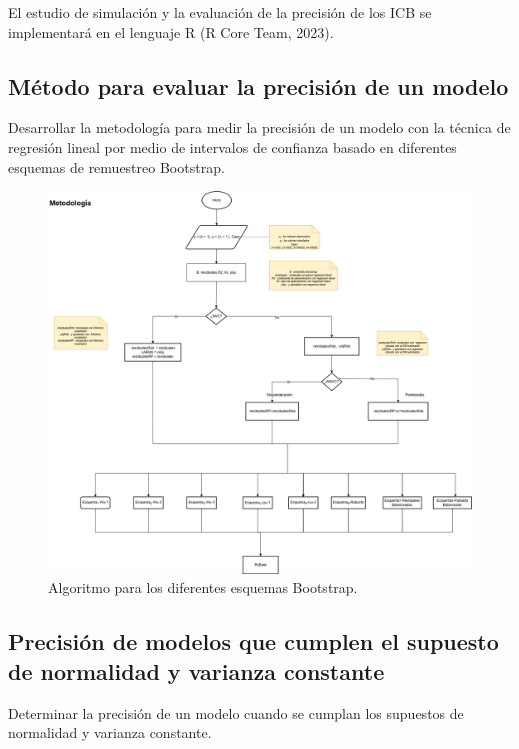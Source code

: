 El estudio de simulación y la evaluación de la precisión de los ICB se implementará en el lenguaje R (R Core Team, 2023).



\vspace{1.5cm}
\subsection{Método para evaluar la precisión de un modelo}

Desarrollar la metodología para medir la precisión de un modelo con la técnica de regresión lineal por medio de intervalos de confianza basado en diferentes esquemas de remuestreo Bootstrap. 

\begin{figure}[ht] 
	\centering 
	\includegraphics[width=0.98\linewidth]{img/metodologia.png} 
	\caption{Algoritmo para los diferentes esquemas Bootstrap.} 
\end{figure}




	\vspace{1.5cm}
	\subsection{Precisión de modelos que cumplen el supuesto de normalidad y varianza constante}
	 Determinar la precisión de un modelo cuando se cumplan los supuestos de normalidad y varianza constante.
	 \vspace{1.5cm}
	 
